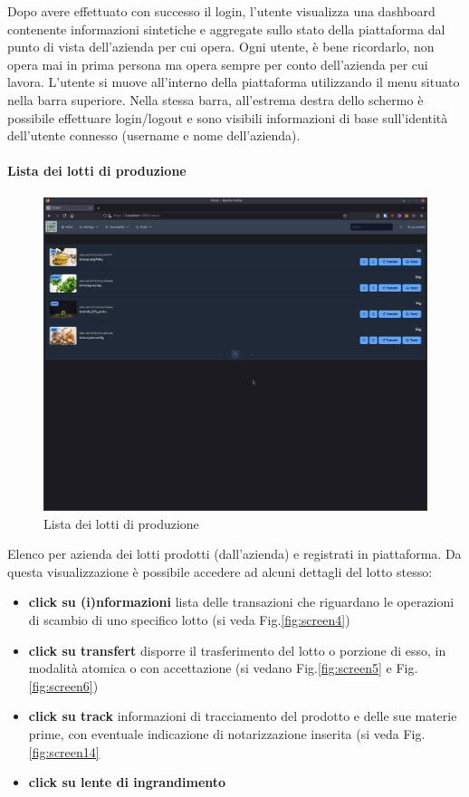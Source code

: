 \documentclass[a4paper,11pt]{article}
\begin{document}
Dopo avere effettuato con successo il login, l'utente visualizza una dashboard contenente informazioni sintetiche e aggregate sullo stato della piattaforma dal punto di vista dell'azienda per cui opera. Ogni utente, è bene ricordarlo, non opera mai in prima persona ma opera sempre per conto dell'azienda per cui lavora. L'utente si muove all'interno della piattaforma utilizzando il menu situato nella barra superiore. Nella stessa barra, all'estrema destra dello schermo è possibile effettuare login/logout e sono visibili informazioni di base sull'identità dell'utente connesso (username e nome dell'azienda).

\paragraph{Lista dei lotti di produzione}

\begin{figure}[H]
  \centering
  \includegraphics[width=0.5\linewidth]{screenIotChain/0003.png}
  \caption{Lista dei lotti di produzione}
  \label{fig:screen3}
\end{figure}

Elenco per azienda dei lotti prodotti (dall'azienda) e registrati in piattaforma. Da questa visualizzazione è possibile accedere ad alcuni dettagli del lotto stesso:

\begin{itemize}
  \item \textbf{click su (i)nformazioni} lista delle transazioni che riguardano le operazioni di scambio di uno specifico lotto (si veda Fig.\ref{fig:screen4})
  \item \textbf{click su transfert} disporre il trasferimento del lotto o porzione di esso, in modalità atomica o con accettazione (si vedano Fig.\ref{fig:screen5} e Fig.\ref{fig:screen6})
  \item  \textbf{click su track} informazioni di tracciamento del prodotto e delle sue materie prime, con eventuale indicazione di notarizzazione inserita (si veda Fig. \ref{fig:screen14}
  \item  \textbf{click su lente di ingrandimento} %
\end{itemize}
\end{document}
